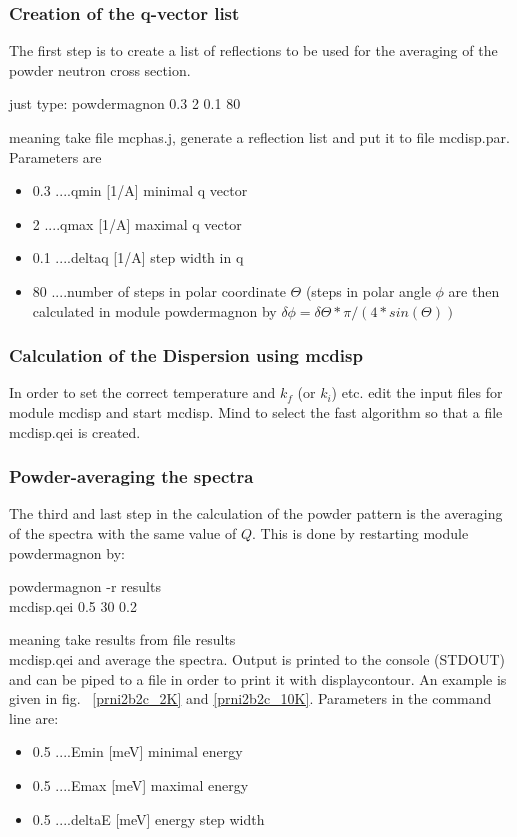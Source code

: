 \subsubsection{Creation of the q-vector list}
The first step is to create a list of reflections to be used for 
the averaging of the powder neutron cross section. 

just type: powdermagnon 0.3 2 0.1 80

meaning take file {\prg mcphas.j}, generate a reflection list and put it to 
file {\prg mcdisp.par}. Parameters are 
\begin{itemize}
\item
 0.3 ....qmin   [1/A] minimal q vector
\item
 2   ....qmax   [1/A] maximal q vector
\item
 0.1 ....deltaq [1/A] step width in q
\item
 80  ....number of steps in polar coordinate $\Theta$
        (steps in polar angle $\phi$ are  then calculated in module
        {\prg powdermagnon} by $\delta \phi= \delta \Theta*\pi/(4*sin(\Theta))$
\end{itemize}

\subsubsection{Calculation of the Dispersion using {\prg mcdisp}}

In order to set the correct temperature and $k_f$ (or $k_i$) etc. edit
the input files for module {\prg mcdisp} and start {\prg mcdisp}. Mind 
to select the fast algorithm so that a file {\prg mcdisp.qei} is created.

\subsubsection{Powder-averaging the spectra}
The third and last step in the calculation of the powder pattern is the averaging
of the spectra with the same value of $Q$. This is done by restarting module
{\prg powdermagnon} by: 

powdermagnon -r results\\mcdisp.qei 0.5 30 0.2 

meaning take  results from file {\prg results\\mcdisp.qei} and average the
spectra. Output is printed to the console (STDOUT) and can be piped to a file in
order to print it with {\prg displaycontour}. An example is given in fig.~
\ref{prni2b2c_2K} and \ref{prni2b2c_10K}.
Parameters in the command line are:
\begin{itemize}
\item 0.5 ....Emin   [meV] minimal energy
\item 0.5 ....Emax   [meV] maximal energy
\item 0.5 ....deltaE [meV] energy step width
\end{itemize}
